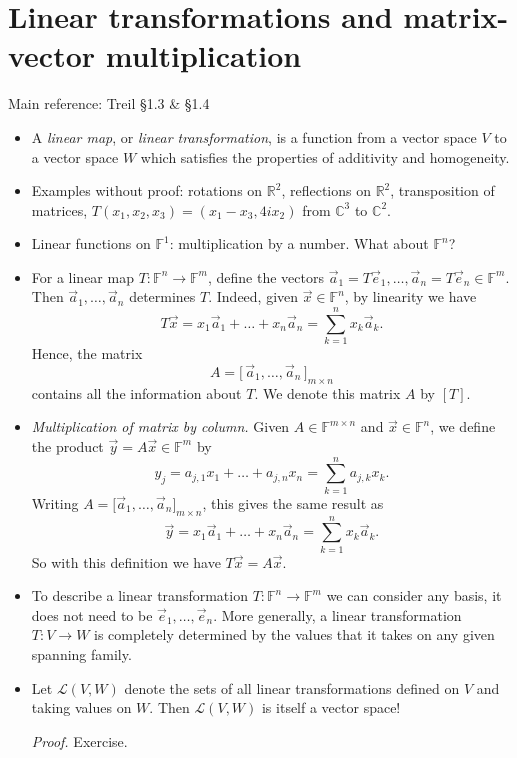 \documentclass[11pt]{article}
\newcommand{\1}{\mathbf{1}}
\newcommand{\0}{\mathbf{0}}
\newcommand{\C}{\mathbb{C}}
\newcommand{\F}{\mathbb{F}}
\newcommand{\cL}{\mathcal{L}}
\newcommand{\R}{\mathbb{R}}
\newcommand{\va}{\vec{a}}
\newcommand{\ve}{\vec{e}}
\newcommand{\vx}{\vec{x}}
\newcommand{\vy}{\vec{y}}
\begin{document}
\clearpage
\section{Linear transformations and matrix-vector multiplication}

Main reference:
Treil \S1.3  \& \S1.4

\begin{itemize}

\item

A \emph{linear map}, or \emph{linear transformation}, is a function from a vector space $V$ to a vector space $W$ which satisfies the properties of additivity and homogeneity.
 
\item

Examples without proof:
rotations on $\R^2$, reflections on $\R^2$, transposition of matrices, $T(x_1,x_2,x_3)=(x_1-x_3,4ix_2)$ from $\C^3$ to $\C^2$.


\item

Linear functions on $\F^1$: multiplication by a number.
What about $\F^n$?

\item

For a linear map $T:\F^n \to \F^m$, define the vectors $\va_1 = T \ve_1,\dots,\va_n = T \ve_n \in \F^m$.
Then $\va_1,\dots,\va_n$ determines $T$.
Indeed, given $\vx\in \F^n$, by linearity we have
\[
T\vx = x_1 \va_1 + \dots + x_n \va_n = \sum_{k=1}^n x_k \va_k.
\]
Hence, the matrix \[ A = \big[\, \va_1 , \dots , \va_n \, \big]_{m \times n} \] contains all the information about $T$.
We denote this matrix $A$ by $[T]$.

\item

\emph{Multiplication of matrix by column.}
Given $A \in \F^{m \times n}$ and $\vx \in\mathbb{F}^n$, we define the product $\vy = A \vx \in \F^m$ by
\[
y_j = a_{j,1} x_1 + \dots + a_{j,n} x_n = \sum_{k=1}^n a_{j,k} x_k.
\]
Writing $A = \big[ \va_1 , \dots , \va_n \big]_{m\times n}$, this gives the same result as
\[
\vy = x_1 \va_1 + \dots + x_n \va_n = \sum_{k=1}^n x_k \va_k
.
\]
So with this definition we have $T\vx = A\vx$.

\item

To describe a linear transformation $T:\F^n \to \F^m$ we can consider any basis, it does not need to be $\ve_1,\dots,\ve_n$.
More generally, a linear transformation $T:V \to W$ is completely determined by the values that it takes on any given spanning family.

\item

Let $\cL(V,W)$ denote the sets of all linear transformations defined on $V$ and taking values on $W$. Then $\cL(V,W)$ is itself a vector space!

\emph{Proof.}
Exercise.

\end{itemize}
\end{document}
